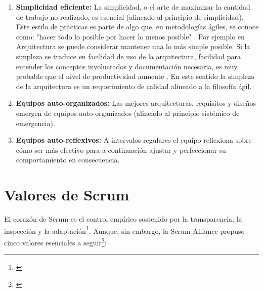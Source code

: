 \begin{enumerate}
\item \textbf{Simplicidad eficiente:} La simplicidad, o el arte de maximizar la cantidad de trabajo no realizado, es esencial (alineado al principio de simplicidad). Este estilo de prácticas es parte de algo que, en metodologías ágiles, se conoce como: "hacer todo lo posible por hacer lo menos posible" \cite{Anacleto-2005}. Por ejemplo en Arquitectura se puede considerar mantener una lo más simple posible. Si la simpleza se traduce en facilidad de uso de la arquitectura, facilidad para entender los conceptos involucrados y documentación necesaria, es muy probable que el nivel de productividad aumente \cite{Anacleto-2005}. En este sentido la simpleza de la arquitectura es un requerimiento de calidad alineado a la filosofía ágil.

\item \textbf{Equipos auto-organizados:} Las mejores arquitecturas, requisitos y diseños emergen de equipos auto-organizados (alineado al principio sistémico de emergencia).

\item \textbf{Equipos auto-reflexivos:} A intervalos regulares el equipo reflexiona sobre cómo ser más efectivo para a continuación ajustar y perfeccionar su comportamiento en consecuencia.

\end{enumerate}

\section{Valores de Scrum}

El corazón de Scrum es el control empírico sostenido por la transparencia, la inspección y la adaptación\footnote{\cite{Ken-Jeff-2013}}. Aunque, sin embargo, la Scrum Alliance propuso cinco valores esenciales a seguir\footnote{\cite{Scrum-Alliance-2015}}: 

